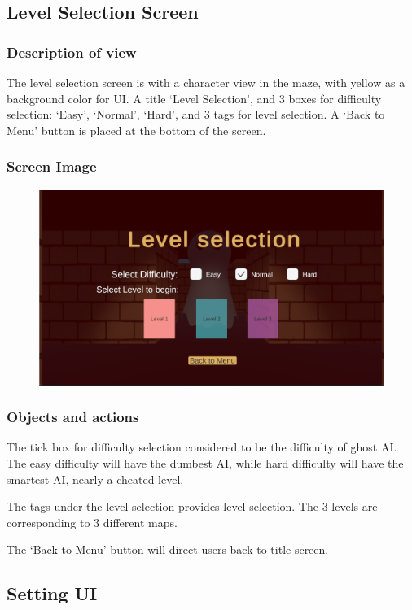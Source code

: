 \documentclass[11pt]{article}
\begin{document}
\subsection{Level Selection Screen}
\subsubsection{Description of view}
The level selection screen is with a character view in the maze, with yellow as a background color for UI. A title `Level Selection', and 3 boxes for difficulty selection: `Easy', `Normal', `Hard', and 3 tags for level selection. A `Back to Menu' button is placed at the bottom of the screen.
\subsubsection{Screen Image}
\begin{figure}[H]
    \centering
    \includegraphics*[scale=0.2]{UI1.1LevelSelection.png}
\end{figure}
\subsubsection{Objects and actions}
The tick box for difficulty selection considered to be the difficulty of ghost AI. The easy difficulty will have the dumbest AI, while hard difficulty will have the smartest AI, nearly a cheated level.

The tags under the level selection provides level selection. The 3 levels are corresponding to 3 different maps.

The `Back to Menu' button will direct users back to title screen.


\subsection{Setting UI}
\end{document}
